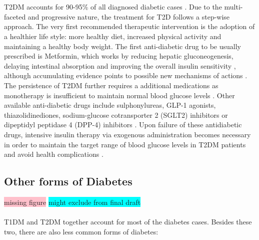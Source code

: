\\\\
T2DM accounts for 90-95\% of all diagnosed diabetic cases \textbf{\cite{home_idf_nodate,banday_pathophysiology_2020,elsayed_2_2022}}. Due to the multi-faceted and progressive nature, the treatment for T2D follows a step-wise approach. The very first recommended therapeutic intervention is the adoption of a healthier life style: more healthy diet, increased physical activity and maintaining a healthy body weight. The first anti-diabetic drug to be usually prescribed is Metformin, which works by reducing hepatic gluconeogenesis, delaying intestinal absorption and improving the overall insulin sensitivity \textbf{\cite{kaneto_multifaceted_2021}}, although accumulating evidence points to possible new mechanisms of actions \textbf{\cite{foretz_metformin_2023}}. The persistence of T2DM further requires a additional medications as monotherapy is insufficient to maintain normal blood glucose levels \textbf{\cite{home_idf_nodate,nathan_medical_2009}}. Other available anti-diabetic drugs include sulphonylureas, GLP-1 agonists, thiazolidinediones, sodium-glucose cotransporter 2 (SGLT2) inhibitors or dipeptidyl peptidase 4 (DPP-4) inhibitors \textbf{\cite{home_idf_nodate,nathan_medical_2009,american_diabetes_association_8_2017}}. Upon failure of these antidiabetic drugs, intensive insulin therapy via exogenous administration becomes necessary in order to maintain the target range of blood glucose levels in T2DM patients and avoid health complications \textbf{\cite{home_idf_nodate}}.

\clearpage

\subsection{Other forms of Diabetes}
\label{sec:otherdm}
\colorbox{pink}{missing figure} \colorbox{cyan}{might exclude from final draft} \\\\
T1DM and T2DM together account for most of the diabetes cases. Besides these two, there are also less common forms of diabetes:

